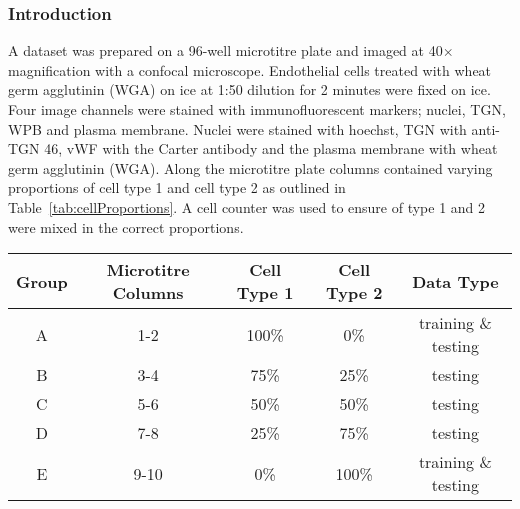 \subsubsection{Introduction}
A dataset was prepared on a 96-well microtitre plate and imaged at 40$\times$ magnification with a confocal microscope. Endothelial cells treated with wheat germ agglutinin (WGA) on ice at 1:50 dilution for 2 minutes were fixed on ice. Four image channels were stained with immunofluorescent markers; nuclei, TGN, WPB and plasma membrane. Nuclei were stained with hoechst, TGN with anti-TGN 46, vWF with the Carter antibody and the plasma membrane with wheat germ agglutinin (WGA). Along the microtitre plate columns contained varying proportions of cell type 1 and cell type 2 as outlined in Table~\ref{tab:cellProportions}. A cell counter was used to ensure of type 1 and 2 were mixed in the correct proportions.

\begin{center}
	\footnotesize
	\begin{tabular}{ |c|c|cc|c|} \hline
		Group & Microtitre Columns & Cell Type 1 & Cell Type 2 & Data Type \\ \hline
		A & 1-2  & 100\% & 0\%   & training \& testing \\ 
		B & 3-4  & 75\%  & 25\%  & testing  \\ 
		C & 5-6  & 50\%  & 50\%  & testing  \\ 
		D & 7-8  & 25\%  & 75\%  & testing  \\ 
		E & 9-10 & 0\%   & 100\% & training \& testing \\ \hline
	\end{tabular}
	\label{tab:cellProportions}
\end{center}

